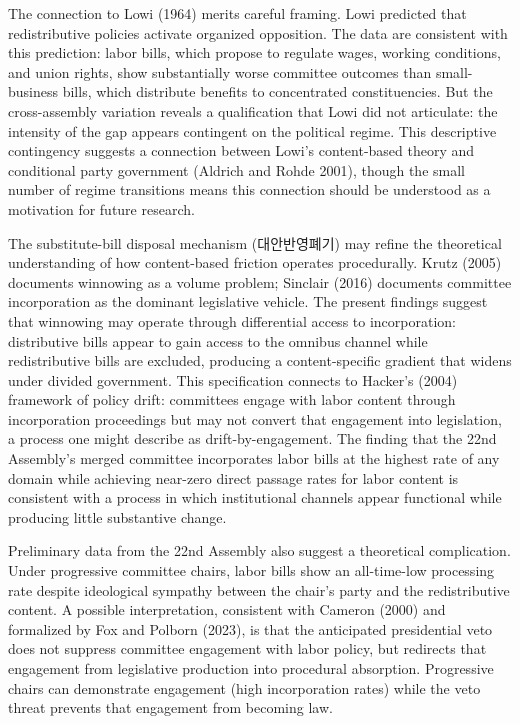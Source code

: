 \documentclass[11pt]{article}
\begin{document}
The connection to Lowi (1964) merits careful framing. Lowi predicted that redistributive policies activate organized opposition. The data are consistent with this prediction: labor bills, which propose to regulate wages, working conditions, and union rights, show substantially worse committee outcomes than small-business bills, which distribute benefits to concentrated constituencies. But the cross-assembly variation reveals a qualification that Lowi did not articulate: the intensity of the gap appears contingent on the political regime. This descriptive contingency suggests a connection between Lowi's content-based theory and conditional party government (Aldrich and Rohde 2001), though the small number of regime transitions means this connection should be understood as a motivation for future research.

The substitute-bill disposal mechanism (대안반영폐기) may refine the theoretical understanding of how content-based friction operates procedurally. Krutz (2005) documents winnowing as a volume problem; Sinclair (2016) documents committee incorporation as the dominant legislative vehicle. The present findings suggest that winnowing may operate through differential access to incorporation: distributive bills appear to gain access to the omnibus channel while redistributive bills are excluded, producing a content-specific gradient that widens under divided government. This specification connects to Hacker's (2004) framework of policy drift: committees engage with labor content through incorporation proceedings but may not convert that engagement into legislation, a process one might describe as drift-by-engagement. The finding that the 22nd Assembly's merged committee incorporates labor bills at the highest rate of any domain while achieving near-zero direct passage rates for labor content is consistent with a process in which institutional channels appear functional while producing little substantive change.

Preliminary data from the 22nd Assembly also suggest a theoretical complication. Under progressive committee chairs, labor bills show an all-time-low processing rate despite ideological sympathy between the chair's party and the redistributive content. A possible interpretation, consistent with Cameron (2000) and formalized by Fox and Polborn (2023), is that the anticipated presidential veto does not suppress committee engagement with labor policy, but redirects that engagement from legislative production into procedural absorption. Progressive chairs can demonstrate engagement (high incorporation rates) while the veto threat prevents that engagement from becoming law.
\end{document}
